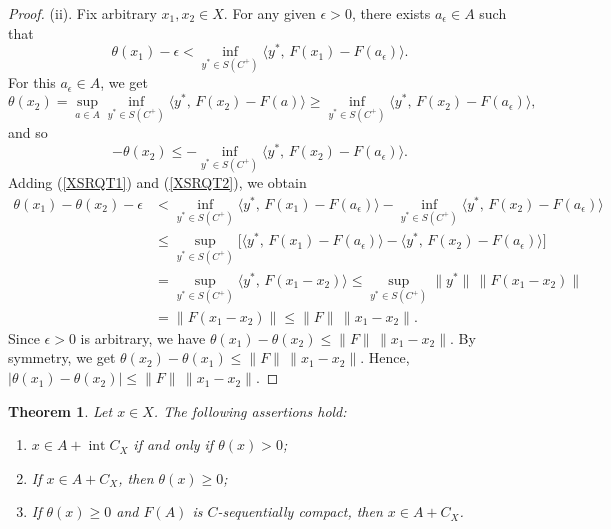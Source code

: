 \documentclass[10pt,a4paper]{amsart}
\newtheorem{theorem}{Theorem}[section]
\begin{document}
\begin{proof}
	(ii). Fix arbitrary $x_1,x_2\in X$. For any given $\epsilon>0$, there exists $a_\epsilon\in A$ such that
	\begin{equation}   \label{XSRQT1}
		\theta(x_1)-\epsilon < \inf_{y^*\in S(C^+)}\langle y^*,\,F(x_1)-F(a_\epsilon)\rangle .  
	\end{equation}
	For this $a_\epsilon\in A$, we get 
$$
		\theta(x_2)=\sup_{a\in A}\inf_{y^*\in S(C^+)}\langle y^*,\,F(x_2)-F(a)\rangle
		\ge \inf_{y^*\in S(C^+)}\langle y^*,\,F(x_2)-F(a_\epsilon)\rangle , 
$$
 and so
	\begin{equation}\label{XSRQT2}
		-\theta(x_2)\le -\inf_{y^*\in S(C^+)}\langle y^*,\,F(x_2)-F(a_\epsilon)\rangle .  
	\end{equation}
	Adding  (\ref{XSRQT1})  and  (\ref{XSRQT2}), we obtain
	\begin{align*}
		\theta(x_1)-\theta(x_2)-\epsilon 
		&< \inf_{y^*\in S(C^+)}\langle y^*,\,F(x_1)-F(a_\epsilon)\rangle
		-\inf_{y^*\in S(C^+)}\langle y^*,\,F(x_2)-F(a_\epsilon)\rangle \\
		&\le \sup_{y^*\in S(C^+)}\Big[
		\langle y^*,\,F(x_1)-F(a_\epsilon)\rangle
		-\langle y^*,\,F(x_2)-F(a_\epsilon)\rangle
		\Big] \\
		&= \sup_{y^*\in S(C^+)} \langle y^*,\,F(x_1-x_2)\rangle  
		\le \sup_{y^*\in S(C^+)} \|y^*\|\,\|F(x_1-x_2)\| \\
		&= \|F(x_1-x_2)\| \le \|F\|\,\|x_1-x_2\|.
	\end{align*}
	Since $\epsilon>0$ is arbitrary, we have
$	\theta(x_1)-\theta(x_2) \le \|F\|\,\|x_1-x_2\|. $
	By symmetry,  we get
$	\theta(x_2)-\theta(x_1) \le \|F\|\,\|x_1-x_2\|.$
	Hence,
	$	|\theta(x_1)-\theta(x_2)| \le \|F\|\,\|x_1-x_2\|.$
\end{proof}

\begin{theorem}  \label{TxEQ} 
	Let $x\in X$. The following assertions hold:
	\begin{enumerate}
		\item[(i)] $x\in A + \operatorname{int}C_X$ if and only if $\theta(x)>0$;
		\item[(ii)] If $x\in A + C_X$, then $\theta(x)\ge 0$;
		\item[(iii)] If $\theta(x)\ge 0$ and $F(A)$ is $C$-sequentially compact, then $x\in A + C_X$.
	\end{enumerate}
\end{theorem}
\end{document}
